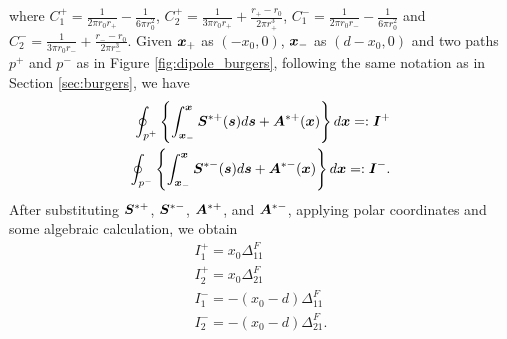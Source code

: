 \documentclass[11pt,letterpaper]{article}
\begin{document}
where $C_1^+= \frac{1}{2\pi r_0 r_+}- \frac{1}{6 \pi r_0^2}$, $C_2^+=\frac{1}{3\pi r_0 r_+}+\frac{r_+-r_0}{2\pi r_+^3}$, $C_1^-= \frac{1}{2\pi r_0 r_-}- \frac{1}{6 \pi r_0^2}$ and $C_2^-=\frac{1}{3\pi r_0 r_-}+\frac{r_--r_0}{2\pi r_-^3}$. 
Given $\bfx_+$ as $(-x_0,0)$, $\bfx_-$ as $(d-x_0,0)$ and two paths $p^+$ and $p^-$ as in Figure \ref{fig:dipole_burgers}, following the same notation as in Section \ref{sec:burgers}, we have
\begin{eqnarray*}
\oint_{p^+} \left \{\int_{\bfx_-}^{\bfx}\bfS^{*+}(\bfs) d\bfs  + \bfA^{*+}(\bfx)\right \} d\bfx =: \bfI^+\\
\oint_{p^-} \left \{\int_{\bfx_-}^{\bfx}\bfS^{*-}(\bfs) d\bfs  + \bfA^{*-}(\bfx)\right \} d\bfx =: \bfI^-.
\end{eqnarray*}
After substituting $\bfS^{*+}$, $\bfS^{*-}$, $\bfA^{*+}$, and $\bfA^{*-}$, applying polar coordinates and some algebraic calculation, we obtain
\begin{eqnarray*}
I^+_1 =  x_0 \Delta^F_{11} \\
I^+_2 = x_0 \Delta^F_{21} \\
I^-_1 = -(x_0-d)\Delta^F_{11}\\
I^-_2 =  -(x_0-d) \Delta^F_{21}.
\end{eqnarray*}


\newpage


\end{document}
